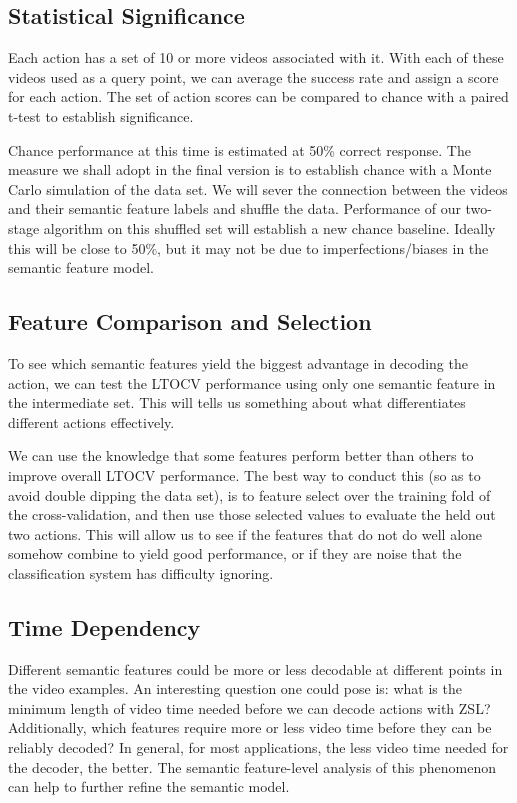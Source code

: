 \documentclass{article}
\begin{document}
\subsection{Statistical Significance}
Each action has a set of 10 or more videos associated with it. With each of these videos used as a query point, we can average the success rate and assign a score for each action. The set of action scores can be compared to chance with a paired t-test to establish significance.

Chance performance at this time is estimated at 50\% correct response.  The measure we shall adopt in the final version is to establish chance with a Monte Carlo simulation of the data set. We will sever the connection between the videos and their semantic feature labels and shuffle the data. Performance of our two-stage algorithm on this shuffled set will establish a new chance baseline. Ideally this will be close to 50\%, but it may not be due to imperfections/biases in the semantic feature model.
\label{stats}
\subsection{Feature Comparison and Selection}
To see which semantic features yield the biggest advantage in decoding the action, we can test the LTOCV performance using only one semantic feature in the intermediate set. This will tells us something about what differentiates different actions effectively.

We can use the knowledge that some features perform better than others to improve overall LTOCV performance.  The best way to conduct this (so as to avoid double dipping the data set), is to feature select over the training fold of the cross-validation, and then use those selected values to evaluate the held out two actions. This will allow us to see if the features that do not do well alone somehow combine to yield good performance, or if they are noise that the classification system has difficulty ignoring.
\label{fcomp}
\subsection{Time Dependency}
Different semantic features could be more or less decodable at different points in the video examples. An interesting question one could pose is: what is the minimum length of video time needed before we can decode actions with ZSL? Additionally, which features require more or less video time before they can be reliably decoded? In general, for most applications, the less video time needed for the decoder, the better.  The semantic feature-level analysis of this phenomenon can help to further refine the semantic model.
\end{document}
